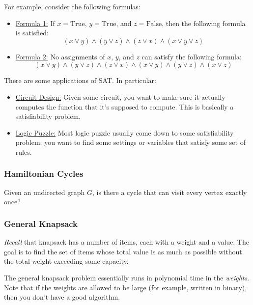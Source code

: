 \documentclass[letterpaper]{article}
\begin{document}
For example, consider the following formulas: 
\begin{itemize}
    \item \underline{Formula 1:} If $x = \text{True}$, $y = \text{True}$, and $z = \text{False}$, then the following formula is satisfied: 
    \[(x \lor y) \land (y \lor z) \land (z \lor x) \land (\overline{x} \lor \overline{y} \lor \overline{z})\]

    \item \underline{Formula 2:} No assignments of $x$, $y$, and $z$ can satisfy the following formula: 
    \[(x \lor y) \land (y \lor z) \land (z \lor x) \land (\overline{x} \lor \overline{y}) \land (\overline{y} \lor \overline{z}) \land (\overline{x} \lor \overline{z})\]
\end{itemize}
There are some applications of SAT. In particular: 
\begin{itemize}
    \item \underline{Circuit Design:} Given some circuit, you want to make sure it actually computes the function that it's supposed to compute. This is basically a satisfiability problem.
    \item \underline{Logic Puzzle:} Most logic puzzle usually come down to some satisfiability problem; you want to find some settings or variables that satisfy some set of rules. 
\end{itemize}


\subsubsection{Hamiltonian Cycles}
Given an undirected graph $G$, is there a cycle that can visit every vertex exactly once? 

\subsubsection{General Knapsack}
\emph{Recall} that knapsack has a number of items, each with a weight and a value. The goal is to find the set of items whose total value is as much as possible without the total weight exceeding some capacity. 

\bigskip 

The general knapsack problem essentially runs in polynomial time in the \emph{weights}. Note that if the weights are allowed to be large (for example, written in binary), then you don't have a good algorithm. 
\end{document}
